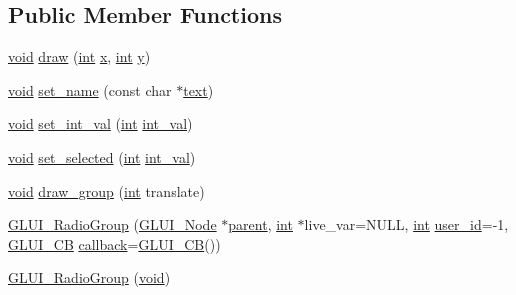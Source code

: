 \subsection*{Public Member Functions}
\begin{DoxyCompactItemize}
\item 
\hyperlink{wglext_8h_a9e6b7f1933461ef318bb000d6bd13b83}{void} \hyperlink{class_g_l_u_i___radio_group_ac29a2b338b80e74267efb42f94b380e0}{draw} (\hyperlink{wglext_8h_a500a82aecba06f4550f6849b8099ca21}{int} \hyperlink{glext_8h_ad77deca22f617d3f0e0eb786445689fc}{x}, \hyperlink{wglext_8h_a500a82aecba06f4550f6849b8099ca21}{int} \hyperlink{glext_8h_a9298c7ad619074f5285b32c6b72bfdea}{y})
\item 
\hyperlink{wglext_8h_a9e6b7f1933461ef318bb000d6bd13b83}{void} \hyperlink{class_g_l_u_i___radio_group_a8a3caea1aa9f603fae4ceab1c4e1b83a}{set\+\_\+name} (const char $\ast$\hyperlink{class_g_l_u_i___control_af0d60e9736f4dbc34e9a536e75876d72}{text})
\item 
\hyperlink{wglext_8h_a9e6b7f1933461ef318bb000d6bd13b83}{void} \hyperlink{class_g_l_u_i___radio_group_a9dc08156997557c983d402682dd01557}{set\+\_\+int\+\_\+val} (\hyperlink{wglext_8h_a500a82aecba06f4550f6849b8099ca21}{int} \hyperlink{class_g_l_u_i___control_a4a890b5b5a854b34200b5e63f1069b4e}{int\+\_\+val})
\item 
\hyperlink{wglext_8h_a9e6b7f1933461ef318bb000d6bd13b83}{void} \hyperlink{class_g_l_u_i___radio_group_ade83c982cd22902440bf1b5dcb3971ef}{set\+\_\+selected} (\hyperlink{wglext_8h_a500a82aecba06f4550f6849b8099ca21}{int} \hyperlink{class_g_l_u_i___control_a4a890b5b5a854b34200b5e63f1069b4e}{int\+\_\+val})
\item 
\hyperlink{wglext_8h_a9e6b7f1933461ef318bb000d6bd13b83}{void} \hyperlink{class_g_l_u_i___radio_group_a5feb3d5983d432a037e7fed7ebd7f3c0}{draw\+\_\+group} (\hyperlink{wglext_8h_a500a82aecba06f4550f6849b8099ca21}{int} translate)
\item 
\hyperlink{class_g_l_u_i___radio_group_a36c19d4c90c003ca6f49de004be96a90}{G\+L\+U\+I\+\_\+\+Radio\+Group} (\hyperlink{class_g_l_u_i___node}{G\+L\+U\+I\+\_\+\+Node} $\ast$\hyperlink{class_g_l_u_i___node_a8ed65d447784f6f88bd3e2e2bcac6cdb}{parent}, \hyperlink{wglext_8h_a500a82aecba06f4550f6849b8099ca21}{int} $\ast$live\+\_\+var=N\+U\+L\+L, \hyperlink{wglext_8h_a500a82aecba06f4550f6849b8099ca21}{int} \hyperlink{class_g_l_u_i___control_a6c88b7c72b0800f88a5d4cda4868c8b6}{user\+\_\+id}=-\/1, \hyperlink{class_g_l_u_i___c_b}{G\+L\+U\+I\+\_\+\+C\+B} \hyperlink{class_g_l_u_i___control_a96060fe0cc6d537e736dd6eef78e24ab}{callback}=\hyperlink{class_g_l_u_i___c_b}{G\+L\+U\+I\+\_\+\+C\+B}())
\item 
\hyperlink{class_g_l_u_i___radio_group_a3fffc4c3273b548ea011ab8d52654317}{G\+L\+U\+I\+\_\+\+Radio\+Group} (\hyperlink{wglext_8h_a9e6b7f1933461ef318bb000d6bd13b83}{void})
\end{DoxyCompactItemize}
